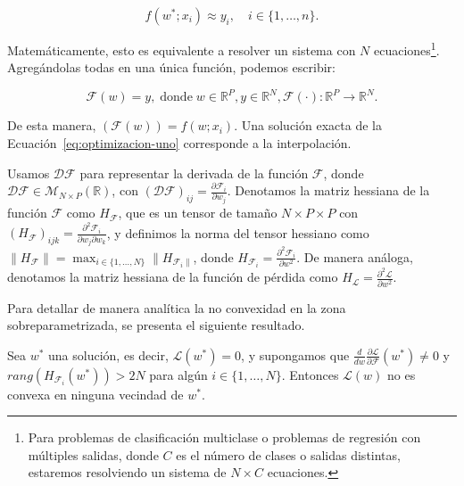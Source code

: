 \[
    f(w^{*}; x_i) \approx y_i, \quad i \in \{1,\ldots,n \}.
\]

Matemáticamente, esto es equivalente a resolver un sistema con $N$ ecuaciones\footnote{Para problemas de clasificación multiclase o problemas de regresión con múltiples salidas, donde $C$ es el número de clases o salidas distintas, estaremos resolviendo un sistema de $N \times C$ ecuaciones.}. Agregándolas todas en una única función, podemos escribir:

\begin{equation}\label{eq:optimizacion-uno}
    \mathcal{F}(w) = y, \; \text{donde} \; w \in \mathbb{R}^{P}, y \in \mathbb{R}^{N}, \mathcal{F}(\cdot):\mathbb{R}^{P} \to \mathbb{R}^{N}.
\end{equation}

De esta manera, $(\mathcal{F}(w)) = f(w; x_i)$. Una solución exacta de la Ecuación~\eqref{eq:optimizacion-uno} corresponde a la interpolación.\newline

Usamos $\mathcal{DF}$ para representar la derivada de la función $\mathcal{F}$, donde $\mathcal{DF} \in \mathcal{M}_{N \times P}(\mathbb{R})$, con $(\mathcal{DF})_{ij} = \frac{\partial \mathcal{F}_{i}}{\partial w_j}$. Denotamos la matriz hessiana de la función $\mathcal{F}$ como $H_{\mathcal{F}}$, que es un tensor de tamaño $N \times P \times P$ con $(H_{\mathcal{F}})_{ijk} = \frac{\partial^2 \mathcal{F}_{i}}{\partial w_j \partial w_k}$, y definimos la norma del tensor hessiano como $\| H_{\mathcal{F}} \| = \max_{i \in \{1, \ldots,N \}} \| H_{\mathcal{F}_{i} \|}$, donde $H_{\mathcal{F}_{i}} = \frac{\partial^2 \mathcal{F}_{i}}{\partial w^2}$. De manera análoga, denotamos la matriz hessiana de la función de pérdida como $H_{\mathcal{L}} = \frac{\partial^2 \mathcal{L}}{\partial w^2}$.\newline

Para detallar de manera analítica la no convexidad en la zona sobreparametrizada, se presenta el siguiente resultado.

\begin{proposicion}\label{prop:non-conexity}
    Sea $w^{*}$ una solución, es decir, $\mathcal{L}(w^{*}) = 0$, y supongamos que $\frac{d}{dw}\frac{\partial \mathcal{L}}{\partial \mathcal{F}}(w^{*}) \neq 0$ y $rang(H_{\mathcal{F}_{i}}(w^{*})) > 2N$ para algún $i \in \{1, \ldots, N \}$. Entonces $\mathcal{L}(w)$ no es convexa en ninguna vecindad de $w^{*}$.
\end{proposicion}

